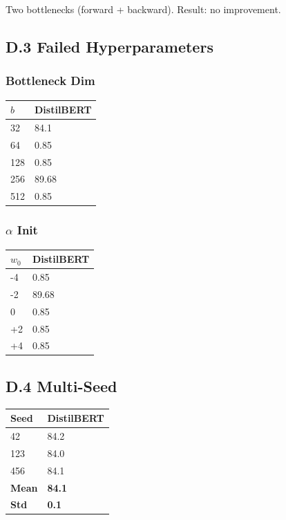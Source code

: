 Two bottlenecks (forward + backward). Result: no improvement.

\subsection{D.3 Failed Hyperparameters}

\subsubsection{Bottleneck Dim}

\begin{table}[H]
\centering
\small
\begin{tabular}{ll}
\toprule
\textbf{$b$} & \textbf{DistilBERT} \\
\midrule
32 & 84.1 \\
64 & 0.85 \\
128 & 0.85 \\
256 & 89.68 \\
512 & 0.85 \\
\bottomrule
\end{tabular}
\end{table}

\subsubsection{$\alpha$ Init}

\begin{table}[H]
\centering
\small
\begin{tabular}{ll}
\toprule
\textbf{$w_0$} & \textbf{DistilBERT} \\
\midrule
-4 & 0.85 \\
-2 & 89.68 \\
0 & 0.85 \\
+2 & 0.85 \\
+4 & 0.85 \\
\bottomrule
\end{tabular}
\end{table}

\subsection{D.4 Multi-Seed}

\begin{table}[H]
\centering
\small
\begin{tabular}{ll}
\toprule
\textbf{Seed} & \textbf{DistilBERT} \\
\midrule
42 & 84.2 \\
123 & 84.0 \\
456 & 84.1 \\
\textbf{Mean} & \textbf{84.1} \\
\textbf{Std} & \textbf{0.1} \\
\bottomrule
\end{tabular}
\end{table}

